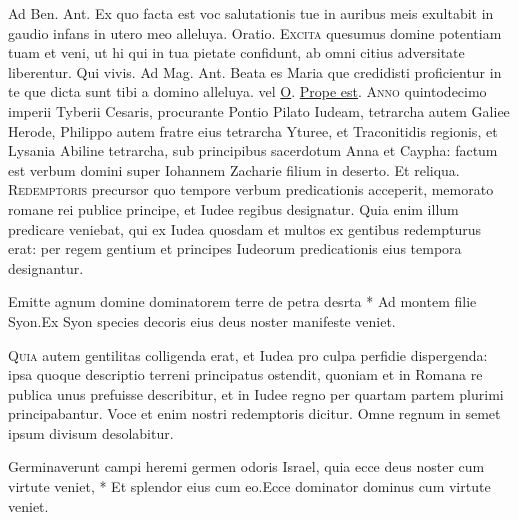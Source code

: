 \begin{multicols*}{2}
\begin{responsory-doxology}
\end{responsory-doxology}
{\color{Red} Ad Ben. Ant.} Ex quo facta est voc salutationis tue in auribus meis exultabit in gaudio infans in utero meo alleluya. {\color{Red} Oratio.}
\lettrine[lines=2]{\zallmancaps \color{Blue} E}{xcita} quesumus domine potentiam tuam et veni, ut hi qui in tua pietate confidunt, ab omni citius adversitate liberentur. Qui vivis. {\color{Red} Ad Mag. Ant.} Beata es Maria que credidisti proficientur in te que dicta sunt tibi a domino alleluya. {\color{Red} vel} \hyperlink{o-antiphons}{O}.
 \hyperlink{prope-est-iam-invitatorium}{Prope est}.
\lettrine[lines=2]{\zallmancaps \color{Red} A}{nno} quintodecimo imperii Tyberii Cesaris, procurante Pontio Pilato Iudeam, tetrarcha autem Galiee Herode, Philippo autem fratre eius tetrarcha Yturee, et Traconitidis regionis, et Lysania Abiline tetrarcha, sub principibus sacerdotum Anna et Caypha: factum est verbum domini super Iohannem Zacharie filium in deserto. Et reliqua.
\lettrine[lines=2]{\zallmancaps \color{Blue} R}{edemptoris} precursor quo tempore verbum predicationis acceperit, memorato romane rei publice principe, et Iudee regibus designatur. Quia enim illum predicare veniebat, qui ex Iudea quosdam et multos ex gentibus redempturus erat: per regem gentium et principes Iudeorum predicationis eius tempora designantur.
\begin{responsory}
{Emitte agnum domine dominatorem terre de petra desrta * Ad montem filie Syon.}{Ex Syon species decoris eius deus noster manifeste veniet.}
\end{responsory}
\lettrine[lines=2]{\zallmancaps \color{Red} Q}{uia} autem gentilitas colligenda erat, et Iudea pro culpa perfidie dispergenda: ipsa quoque descriptio terreni principatus ostendit, quoniam et in Romana re publica unus prefuisse describitur, et in Iudee regno per quartam partem plurimi principabantur. Voce et enim nostri redemptoris dicitur. Omne regnum in semet ipsum divisum desolabitur.
\begin{responsory}
{Germinaverunt campi heremi germen odoris Israel, quia ecce deus noster cum virtute veniet, * Et splendor eius cum eo.}{Ecce dominator dominus cum virtute veniet.}

\end{responsory}
\end{multicols*}
